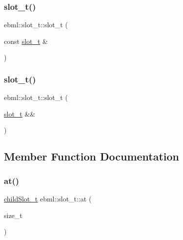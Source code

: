 \subsubsection{\texorpdfstring{slot\+\_\+t()}{slot\_t()}\hspace{0.1cm}{\footnotesize\ttfamily [2/3]}}
{\footnotesize\ttfamily ebml\+::slot\+\_\+t\+::slot\+\_\+t (\begin{DoxyParamCaption}\item[{const \mbox{\hyperlink{classebml_1_1slot__t}{slot\+\_\+t}} \&}]{ }\end{DoxyParamCaption})}

\mbox{\label{classebml_1_1slot__t_a76551cd306d702fbce48749e32187fc9}} 
\subsubsection{\texorpdfstring{slot\+\_\+t()}{slot\_t()}\hspace{0.1cm}{\footnotesize\ttfamily [3/3]}}
{\footnotesize\ttfamily ebml\+::slot\+\_\+t\+::slot\+\_\+t (\begin{DoxyParamCaption}\item[{\mbox{\hyperlink{classebml_1_1slot__t}{slot\+\_\+t}} \&\&}]{ }\end{DoxyParamCaption})}



\subsection{Member Function Documentation}
\mbox{\label{classebml_1_1slot__t_abfa9697fbfa05ad723314497bdc7c299}} 
\subsubsection{\texorpdfstring{at()}{at()}\hspace{0.1cm}{\footnotesize\ttfamily [1/2]}}
{\footnotesize\ttfamily \mbox{\hyperlink{classebml_1_1childSlot__t}{child\+Slot\+\_\+t}} ebml\+::slot\+\_\+t\+::at (\begin{DoxyParamCaption}\item[{size\+\_\+t}]{ }\end{DoxyParamCaption})}

